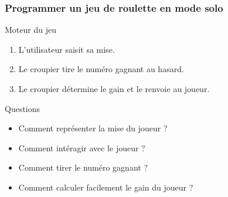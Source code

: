 \documentclass[10pt]{beamer}
\begin{document}
\begin{frame}
  \frametitle{Programmer un jeu de roulette en mode solo}
  \begin{alertblock}{Moteur du jeu}
    \begin{enumerate}
    \item L'utilisateur saisit sa mise.
    \item Le croupier tire le numéro gagnant au hasard. 
    \item Le croupier détermine le gain et le renvoie au joueur.
    \end{enumerate}
  \end{alertblock}


  \begin{block}{Questions}
    \begin{itemize}
    \item Comment représenter la mise du joueur ?
    \item Comment intéragir avec le joueur ?
    \item Comment tirer le numéro gagnant ? 
    \item Comment calculer facilement le gain du joueur ?
    \end{itemize}
  \end{block}
\end{frame}
\end{document}
